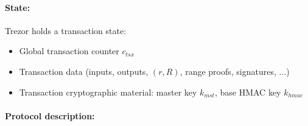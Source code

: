 \documentclass[]{article}
\begin{document}
\paragraph{State:}
Trezor holds a transaction state:
\begin{itemize}
	\item Global transaction counter $c_{tsx}$
	\item Transaction data (inputs, outputs, $(r,R)$, range proofs, signatures, $\dots$)
	\item Transaction cryptographic material: master key $k_{mst}$, base HMAC key $k_{hmac}$
\end{itemize}

\paragraph{Protocol description:}
\end{document}
